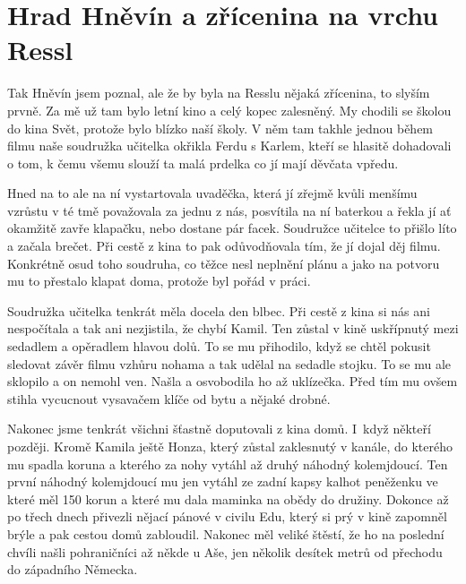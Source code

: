 
\chapter{Hrad Hněvín a zřícenina na vrchu Ressl}

Tak Hněvín jsem poznal, ale že by byla na Resslu nějaká zřícenina, to slyším
prvně. Za mě už tam bylo letní kino a celý kopec zalesněný. My chodili se
školou do kina Svět, protože bylo blízko naší školy. V něm tam takhle jednou
během filmu naše soudružka učitelka okřikla Ferdu s Karlem, kteří se hlasitě
dohadovali o tom, k čemu všemu slouží ta malá prdelka co jí mají děvčata
vpředu.

Hned na to ale na ní vystartovala uvaděčka, která jí zřejmě kvůli menšímu
vzrůstu v té tmě považovala za jednu z nás, posvítila na ní baterkou a řekla jí
ať okamžitě zavře klapačku, nebo dostane pár facek. Soudružce učitelce to
přišlo líto a začala brečet. Při cestě z kina to pak odůvodňovala tím, že jí
dojal děj filmu. Konkrétně osud toho soudruha, co těžce nesl neplnění plánu a
jako na potvoru mu to přestalo klapat doma, protože byl pořád v práci.

Soudružka učitelka tenkrát měla docela den blbec. Při cestě z kina si nás ani
nespočítala a tak ani nezjistila, že chybí Kamil. Ten zůstal v kině uskřípnutý
mezi sedadlem a opěradlem hlavou dolů. To se mu přihodilo, když se chtěl
pokusit sledovat závěr filmu vzhůru nohama a tak udělal na sedadle stojku. To
se mu ale sklopilo a on nemohl ven. Našla a osvobodila ho až uklízečka. Před
tím mu ovšem stihla vycucnout vysavačem klíče od bytu a nějaké drobné.

Nakonec jsme tenkrát všichni šťastně doputovali z kina domů. I~když někteří
později. Kromě Kamila ještě Honza, který zůstal zaklesnutý v kanále, do kterého
mu spadla koruna a kterého za nohy vytáhl až druhý náhodný kolemjdoucí. Ten
první náhodný kolemjdoucí mu jen vytáhl ze zadní kapsy kalhot peněženku ve
které měl 150 korun a které mu dala maminka na obědy do družiny. Dokonce až po
třech dnech přivezli nějací pánové v civilu Edu, který si prý v kině zapomněl
brýle a pak cestou domů zabloudil. Nakonec měl veliké štěstí, že ho na poslední
chvíli našli pohraničníci až někde u Aše, jen několik desítek metrů od přechodu
do západního Německa.

